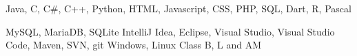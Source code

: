 %
%
%



\begin{keywords}
    {Java, C, C\#, C++, Python, HTML, Javascript, CSS, PHP, SQL, Dart, R, Pascal}

    {MySQL, MariaDB, SQLite}
    {IntelliJ Idea, Eclipse, Visual Studio, Visual Studio Code, Maven, SVN, git}
    {Windows, Linux}
    {Class B, L and AM}
\end{keywords}
